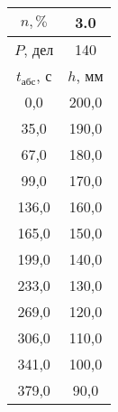 \begin{tabular}[t]{|c|c|}
\hline
$n, \%$ & 3.0 \\
\hline
$P$, дел & 140 \\
\hline
$t_{абс}$, с & $h$, мм \\ 
\hline
0,0 & 200,0 \\ 
35,0 & 190,0 \\ 
67,0 & 180,0 \\ 
99,0 & 170,0 \\ 
136,0 & 160,0 \\ 
165,0 & 150,0 \\ 
199,0 & 140,0 \\ 
233,0 & 130,0 \\ 
269,0 & 120,0 \\ 
306,0 & 110,0 \\ 
341,0 & 100,0 \\ 
379,0 & 90,0 \\ 
\hline
\end{tabular}